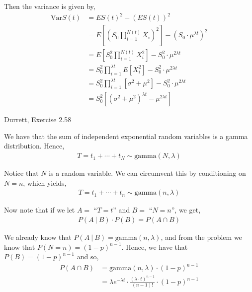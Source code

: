 \documentclass[12pt]{article}
\newenvironment{problem}[2][Problem]{\begin{trivlist}
\item[\hskip \labelsep {\bfseries #1}\hskip \labelsep {\bfseries #2.}]}{\end{trivlist}}
\begin{document}
Then the variance is given by,
\begin{align*}
\text{Var}S(t) &= ES(t)^2 -(ES(t))^2\\
&= E \left[\left(S_0 \prod_{i = 1}^{N(t)} X_i \right)^2 \right] - (S_0 \cdot \mu^{\lambda t})^2\\
&= E\left[S_0^2 \prod_{i = 1}^{N(t)} X_i^2 \right] - S_0^2 \cdot \mu^{2\lambda t}\\
&= S_0^2 \prod_{i = 1}^{\lambda t} E \left[X_i^2 \right]  - S_0^2 \cdot \mu^{2\lambda t}\\
&= S_0^2 \prod_{i = 1}^{\lambda t} \left[\sigma^2 + \mu^2 \right]  - S_0^2 \cdot \mu^{2\lambda t}\\
&= S_0^2 \left[ (\sigma^2 + \mu^2)^{\lambda t} - \mu^{2\lambda t}\right]
\end{align*}

\newpage
\begin{problem}{4}
Durrett, Exercise 2.58
\end{problem}

We have that the sum of independent exponential random variables is a gamma distribution. Hence,
\begin{align*}
T = t_1 + \cdots + t_N \sim \text{gamma}(N, \lambda)
\end{align*}

Notice that $N$ is a random variable. We can circumvent this by conditioning on $N = n$, which yields,
\begin{align*}
T = t_1 + \cdots + t_n \sim \text{gamma}(n, \lambda)
\end{align*}

Now note that if we let $A =$ ``$T = t$'' and $B =$ ``$N = n$'', we get,
\begin{align*}
P(A \ | \ B) \cdot P(B) = P(A \cap B)
\end{align*}

We already know that $P(A \ | \ B) = \text{gamma}(n, \lambda)$, and from the problem we know that $P(N = n) = (1 - p)^{n-1}$. Hence, we have that $P(B) = (1 - p)^{n-1}$ and so,
\begin{align*} 
P(A \cap B) &= \text{gamma}(n, \lambda) \cdot (1 - p)^{n-1}\\
&= \lambda e^{-\lambda t} \cdot \frac{(\lambda \cdot t)^{n-1}}{(n-1)!} \cdot (1 - p)^{n-1}
\end{align*}
\end{document}
